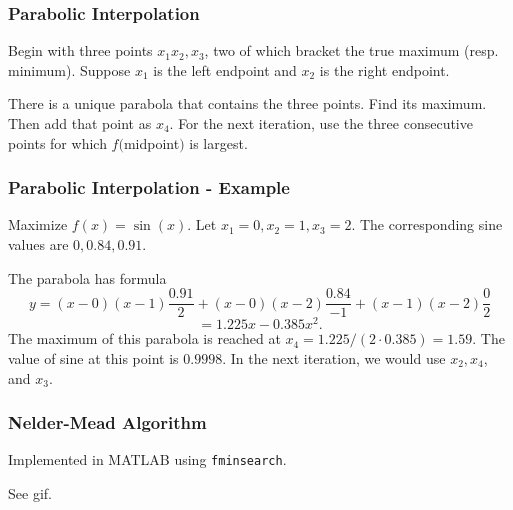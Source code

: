 \documentclass[12pt]{beamer}
\theoremstyle{definition}
\begin{document}
\begin{frame}
\frametitle{Parabolic Interpolation}

Begin with three points $x_1x_2,x_3$, two of which bracket the true maximum (resp. minimum). Suppose $x_1$ is the left endpoint and $x_2$ is the right
endpoint.

There is a unique parabola that contains the three points. Find its maximum.
Then add that point as $x_4$. For the next iteration, use the three
consecutive points for which $f($midpoint$)$ is largest.
\end{frame}

\begin{frame}
\frametitle{Parabolic Interpolation - Example}
Maximize $f(x) = \sin(x)$. Let $x_1 = 0, x_2 = 1, x_3 = 2$. The corresponding
sine values are $0, 0.84, 0.91$.

The parabola has formula 
\[y = (x -0)(x-1)\frac{0.91}{2} + (x -0)(x-2)\frac{0.84}{-1}
+ (x-1)(x-2)\frac{0}{2}\]
\[ = 1.225 x-0.385 x^2.
\]
The maximum of this parabola is reached at 
$x_4 = 1.225/(2\cdot 0.385) = 1.59$.
The value of sine at this point is $0.9998$. In the next iteration, we 
would use $x_2,x_4$, and $x_3$.
\end{frame}
\begin{frame}
\frametitle{Nelder-Mead Algorithm}

Implemented in MATLAB using {\tt fminsearch}.

See gif.
\end{frame}
\end{document}

